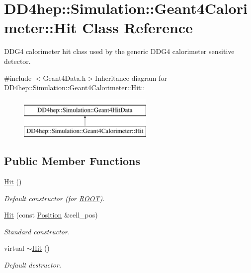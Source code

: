 \hypertarget{class_d_d4hep_1_1_simulation_1_1_geant4_calorimeter_1_1_hit}{
\section{DD4hep::Simulation::Geant4Calorimeter::Hit Class Reference}
\label{class_d_d4hep_1_1_simulation_1_1_geant4_calorimeter_1_1_hit}
}


DDG4 calorimeter hit class used by the generic DDG4 calorimeter sensitive detector.  


{\ttfamily \#include $<$Geant4Data.h$>$}Inheritance diagram for DD4hep::Simulation::Geant4Calorimeter::Hit::\begin{figure}[H]
\begin{center}
\leavevmode
\includegraphics[height=2cm]{class_d_d4hep_1_1_simulation_1_1_geant4_calorimeter_1_1_hit}
\end{center}
\end{figure}
\subsection*{Public Member Functions}
\begin{DoxyCompactItemize}
\item 
\hyperlink{class_d_d4hep_1_1_simulation_1_1_geant4_calorimeter_1_1_hit_aa82fe18c0b10841fcba68e73c2efd0b0}{Hit} ()
\begin{DoxyCompactList}\small\item\em Default constructor (for \hyperlink{namespace_r_o_o_t}{ROOT}). \item\end{DoxyCompactList}\item 
\hyperlink{class_d_d4hep_1_1_simulation_1_1_geant4_calorimeter_1_1_hit_ac32b075818d49af9ee0a119877c68980}{Hit} (const \hyperlink{namespace_d_d4hep_1_1_simulation_ad6fd94b3439e31d1ba4b2e640d578558}{Position} \&cell\_\-pos)
\begin{DoxyCompactList}\small\item\em Standard constructor. \item\end{DoxyCompactList}\item 
virtual \hyperlink{class_d_d4hep_1_1_simulation_1_1_geant4_calorimeter_1_1_hit_a57de79fef476cc5fb8564e1b712d0aad}{$\sim$Hit} ()
\begin{DoxyCompactList}\small\item\em Default destructor. \item\end{DoxyCompactList}\end{DoxyCompactItemize}
